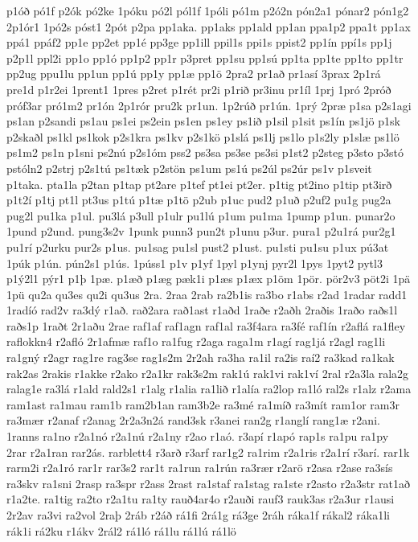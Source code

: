 {p1óð
pó1f
p2ók
pó2ke
1póku
pó2l
pól1f
1póli
pó1m
p2ó2n
pón2a1
pónar2
pón1g2
2p1ór1
1pó2s
póst1
2pót
p2pa
pp1aka.
pp1aks
pp1ald
pp1an
ppa1p2
ppa1t
pp1ax
ppá1
ppáf2
pp1e
pp2et
pp1é
pp3ge
pp1ill
ppil1s
ppi1s
ppist2
pp1ín
ppí1s
pp1j
p2p1l
ppl2i
pp1o
pp1ó
pp1p2
pp1r
p3pret
pp1su
pp1sú
pp1ta
pp1te
pp1to
pp1tr
pp2ug
ppu1lu
pp1un
pp1ú
pp1y
pp1æ
pp1ö
2pra2
pr1að
pr1así
3prax
2p1rá
pre1d
p1r2ei
1prent1
1pres
p2ret
p1rét
pr2i
p1rið
pr3inu
pr1íl
1prj
1pró
2próð
próf3ar
pró1m2
pr1ón
2p1rór
pru2k
pr1un.
1p2rúð
pr1ún.
1prý
2præ
p1sa
p2s1agi
ps1an
p2sandi
ps1au
ps1ei
ps2ein
ps1en
ps1ey
ps1ið
p1sil
p1sit
ps1ín
ps1jö
p1sk
p2skaðl
ps1kl
ps1kok
p2s1kra
ps1kv
p2s1kö
p1slá
ps1lj
ps1lo
p1s2ly
p1slæ
ps1lö
ps1m2
ps1n
p1sni
ps2nú
p2s1óm
pss2
ps3sa
ps3se
ps3si
p1st2
p2steg
p3sto
p3stó
pstóln2
p2strj
p2s1tú
ps1tæk
p2stön
ps1um
ps1ú
ps2úl
ps2úr
ps1v
p1sveit
p1taka.
pta1la
p2tan
p1tap
pt2are
p1tef
pt1ei
pt2er.
p1tig
pt2ino
p1tip
pt3irð
p1t2í
p1tj
pt1l
pt3us
p1tú
p1tæ
p1tö
p2ub
p1uc
pud2
p1uð
p2uf2
pu1g
pug2a
pug2l
pu1ka
p1ul.
pu3lá
p3ull
p1ulr
pu1lú
p1um
pu1ma
1pump
p1un.
punar2o
1pund
p2und.
pung3s2v
1punk
punn3
pun2t
p1unu
p3ur.
pura1
p2u1rá
pur2g1
pu1rí
p2urku
pur2s
p1us.
pu1sag
pu1sl
pust2
p1ust.
pu1sti
pu1su
p1ux
pú3at
1púk
p1ún.
pún2s1
p1ús.
1púss1
p1v
p1yf
1pyl
p1ynj
pyr2l
1pys
1pyt2
pytl3
p1ý2l1
pýr1
p1þ
1pæ.
p1æð
p1æg
pæk1i
p1æs
p1æx
p1öm
1pör.
pör2v3
pöt2i
1pä
1pü
qu2a
qu3es
qu2i
qu3us
2ra.
2raa
2rab
ra2b1is
ra3bo
r1abs
r2ad
1radar
radd1
1radíó
rad2v
ra3dý
r1að.
rað2ara
rað1ast
r1aðd
1raðe
r2aðh
2raðis
1raðo
raðs1l
raðs1p
1raðt
2r1aðu
2rae
raf1af
raf1agn
raf1al
ra3f4ara
ra3fé
raf1ín
r2aflá
ra1fley
raflokkn4
r2afló
2r1afmæ
raf1o
ra1fug
r2aga
raga1m
r1agí
rag1já
r2agl
rag1li
ra1gný
r2agr
rag1re
rag3se
rag1s2m
2r2ah
ra3ha
ra1il
ra2is
raí2
ra3kad
ra1kak
rak2as
2rakis
r1akke
r2ako
r2a1kr
rak3s2m
rak1ú
rak1vi
rak1ví
2ral
r2a3la
rala2g
ralag1e
ra3lá
r1ald
rald2s1
r1alg
r1alia
ra1lið
r1alía
ra2lop
ra1ló
ral2s
r1alz
r2ama
ram1ast
ra1mau
ram1b
ram2b1an
ram3b2e
ra3mé
ra1míð
ra3mít
ram1or
ram3r
ra3mær
r2anaf
r2anag
2r2a3n2á
rand3sk
r3anei
ran2g
r1anglí
rang1æ
r2ani.
1ranns
ra1no
r2a1nó
r2a1nú
r2a1ny
r2ao
r1aó.
r3apí
r1apó
rap1s
ra1pu
ra1py
2rar
r2a1ran
rar2ás.
rarblett4
r3arð
r3arf
rar1g2
ra1rim
r2a1ris
r2a1rí
r3arí.
rar1k
rarm2i
r2a1ró
rar1r
rar3s2
rar1t
ra1run
ra1rún
ra3rær
r2arö
r2asa
r2ase
ra3sís
ra3skv
ra1sni
2rasp
ra3spr
r2ass
2rast
ra1staf
ra1stag
ra1ste
r2asto
r2a3str
rat1að
r1a2te.
ra1tig
ra2to
r2a1tu
ra1ty
rauð4ar4o
r2auði
rauf3
rauk3as
r2a3ur
r1ausi
2r2av
ra3vi
ra2vol
2raþ
2ráb
r2áð
rá1fi
2rá1g
rá3ge
2ráh
ráka1f
rákal2
ráka1li
rák1i
rá2ku
r1ákv
2rál2
rá1ló
rá1lu
rá1lú
rá1lö
}
